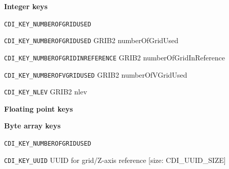 \textbf{Integer keys}

\vspace*{3mm}
\hspace*{8mm}\begin{minipage}{15cm}
\begin{deflist}{\large\texttt{CDI\_KEY\_NUMBEROFGRIDUSED \ \ }}
\item[\large\texttt{CDI\_KEY\_NUMBEROFGRIDUSED}]   GRIB2 numberOfGridUsed
\item[\large\texttt{CDI\_KEY\_NUMBEROFGRIDINREFERENCE}]   GRIB2 numberOfGridInReference
\item[\large\texttt{CDI\_KEY\_NUMBEROFVGRIDUSED}]   GRIB2 numberOfVGridUsed
\item[\large\texttt{CDI\_KEY\_NLEV}]   GRIB2 nlev
\end{deflist}
\end{minipage}
\vspace*{4mm}

\textbf{Floating point keys}

\textbf{Byte array keys}

\vspace*{3mm}
\hspace*{8mm}\begin{minipage}{15cm}
\begin{deflist}{\large\texttt{CDI\_KEY\_NUMBEROFGRIDUSED \ \ }}
\item[\large\texttt{CDI\_KEY\_UUID}]   UUID for grid/Z-axis reference [size: CDI\_UUID\_SIZE]
\end{deflist}
\end{minipage}
\vspace*{4mm}
